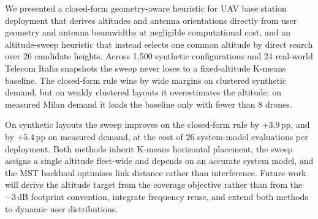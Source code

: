 \documentclass[conference]{IEEEtran}
\begin{document}
We presented a closed-form geometry-aware heuristic for UAV base station deployment that derives altitudes and antenna orientations directly from user geometry and antenna beamwidths at negligible computational cost, and an altitude-sweep heuristic that instead selects one common altitude by direct search over $26$ candidate heights. Across 1{,}500 synthetic configurations and 24 real-world Telecom Italia snapshots the sweep never loses to a fixed-altitude K-means baseline. The closed-form rule wins by wide margins on clustered synthetic demand, but on weakly clustered layouts it overestimates the altitude: on measured Milan demand it leads the baseline only with fewer than $8$ drones.

On synthetic layouts the sweep improves on the closed-form rule by $+3.9$\,pp, and by $+5.4$\,pp on measured demand, at the cost of $26$ system-model evaluations per deployment. Both methods inherit K-means horizontal placement, the sweep assigns a single altitude fleet-wide and depends on an accurate system model, and the MST backhaul optimises link distance rather than interference. Future work will derive the altitude target from the coverage objective rather than from the $-3$\,dB footprint convention, integrate frequency reuse, and extend both methods to dynamic user distributions.







\end{document}
